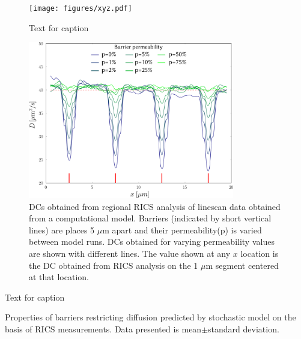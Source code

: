 

%
\begin{figure}
  \centering
    \texttt{[image: figures/xyz.pdf]}
    \caption{Text for caption}
    \label{fig:xyz}
\end{figure}

\begin{figure}
  \centering
    \includegraphics[width=9cm]{figures/range_5.pdf}
    \caption[Regional \acsp{DC} for barriers 5 $\mu$m apart]{\acsp{DC} obtained
    from regional \ac{RICS} analysis of linescan data obtained from a
    computational model. Barriers (indicated by short vertical lines) are
    places 5 $\mu$m apart and their permeability(p) is varied between model
    runs. \acsp{DC} obtained for varying permeability values are shown with
    different lines. The value shown at any $x$ location is the \ac{DC}
    obtained from \ac{RICS} analysis on the 1 $\mu$m segment centered at that
    location.}
    \label{fig:1drange}
\end{figure}

%
\begin{table}
    \begin{center}
        
    \end{center}
    \caption{Text for caption}
    \label{table:xyz}
\end{table}
\begin{table}
    \begin{center}
        
    \end{center}
    \caption[Properties of barriers restricting diffusion]{Properties of
    barriers restricting diffusion predicted by stochastic model on the
    basis of RICS measurements. Data presented is mean$\pm$standard
    deviation.}
    \label{table:model_res}
\end{table}
